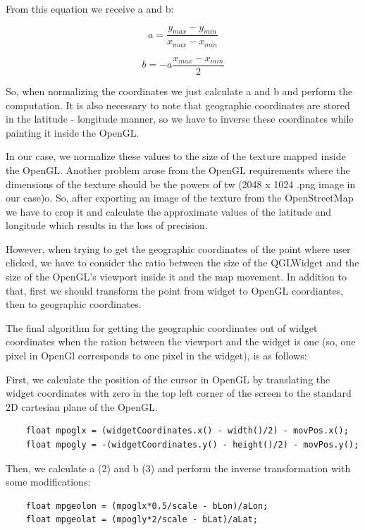 \documentclass{article}
\begin{document}
From this equation we receive a and b:

\begin{equation}
a = \frac{y_{max} - y_{min}}{x_{max} - x_{min}}
\end{equation}

\begin{equation}
b = -a\frac{x_{max} - x_{min}}{2}
\end{equation}

So, when normalizing the coordinates we just calculate a and b and perform the computation. It is also necessary to note that geographic coordinates are stored in the latitude - longitude manner, so we have to inverse these coordinates while painting it inside the OpenGL.

In our case, we normalize these values to the size of the texture mapped inside the OpenGL. Another problem arose from the OpenGL requirements where the dimensions of the texture should be the powers of tw (2048 x 1024 .png image in our case)o. So, after exporting an image of the texture from the OpenStreetMap we have to crop it and calculate the approximate values of the latitude and longitude which results in the loss of precision.

However, when trying to get the geographic coordinates of the point where user clicked, we have to consider the ratio between the size of the QGLWidget and the size of the OpenGL's viewport inside it and the map movement. In addition to that, first we should transform the point from widget to OpenGL coordiantes, then to geographic coordinates.

The final algorithm for getting the geographic coordinates out of widget coordinates when the ration between the viewport and the widget is one (so, one pixel in OpenGl corresponds to one pixel in the widget), is as follows:

First, we calculate the position of the cursor in OpenGL by translating the widget coordinates with zero in the top left corner of the screen to the standard 2D cartesian plane of the OpenGL.

\begin{lstlisting}
    float mpoglx = (widgetCoordinates.x() - width()/2) - movPos.x();
    float mpogly = -(widgetCoordinates.y() - height()/2) - movPos.y();
\end{lstlisting}

Then, we calculate a (2) and b (3) and perform the inverse transformation with some modifications:

\begin{lstlisting}
    float mpgeolon = (mpoglx*0.5/scale - bLon)/aLon;
    float mpgeolat = (mpogly*2/scale - bLat)/aLat;
\end{lstlisting}
\end{document}
